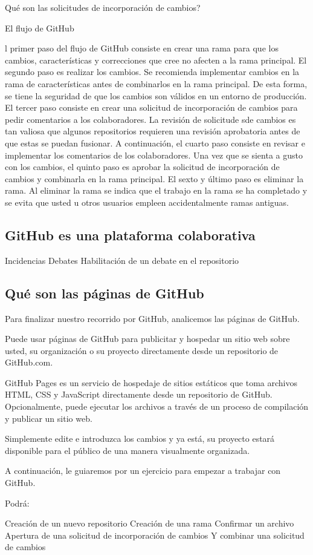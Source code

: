 Qué son las solicitudes de incorporación de cambios?
    

El flujo de GitHub

l primer paso del flujo de GitHub consiste en crear una rama para que los cambios, características y correcciones que cree no afecten a la rama principal.
El segundo paso es realizar los cambios. Se recomienda implementar cambios en la rama de características antes de combinarlos en la rama principal. De esta forma, se tiene la seguridad de que los cambios son válidos en un entorno de producción.
El tercer paso consiste en crear una solicitud de incorporación de cambios para pedir comentarios a los colaboradores. La revisión de solicitude sde cambios es tan valiosa que algunos repositorios requieren una revisión aprobatoria antes de que estas se puedan fusionar.
A continuación, el cuarto paso consiste en revisar e implementar los comentarios de los colaboradores.
Una vez que se sienta a gusto con los cambios, el quinto paso es aprobar la solicitud de incorporación de cambios y combinarla en la rama principal.
El sexto y último paso es eliminar la rama. Al eliminar la rama se indica que el trabajo en la rama se ha completado y se evita que usted u otros usuarios empleen accidentalmente ramas antiguas.


\subsection*{GitHub es una plataforma colaborativa}

Incidencias
Debates
Habilitación de un debate en el repositorio


\subsection*{Qué son las páginas de GitHub}
Para finalizar nuestro recorrido por GitHub, analicemos las páginas de GitHub.

Puede usar páginas de GitHub para publicitar y hospedar un sitio web sobre usted, su organización o su proyecto directamente desde un repositorio de GitHub.com.

GitHub Pages es un servicio de hospedaje de sitios estáticos que toma archivos HTML, CSS y JavaScript directamente desde un repositorio de GitHub. Opcionalmente, puede ejecutar los archivos a través de un proceso de compilación y publicar un sitio web.

Simplemente edite e introduzca los cambios y ya está, su proyecto estará disponible para el público de una manera visualmente organizada.

A continuación, le guiaremos por un ejercicio para empezar a trabajar con GitHub.

Podrá:

Creación de un nuevo repositorio
Creación de una rama
Confirmar un archivo
Apertura de una solicitud de incorporación de cambios
Y combinar una solicitud de cambios